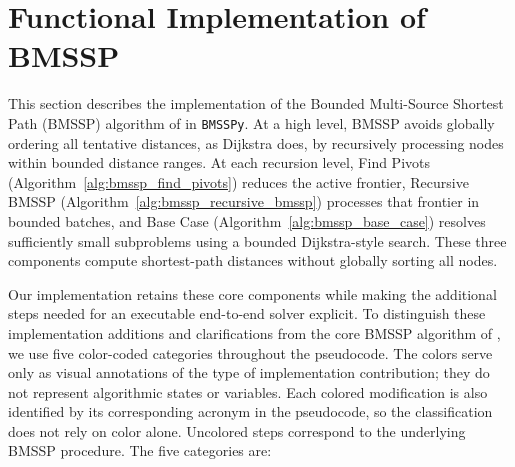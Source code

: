 \documentclass[ijoc,blindrev]{informs3} %
\begin{document}
{\color{blue}
\section{Functional Implementation of BMSSP}\label{sec:func}

This section describes the implementation of the Bounded Multi-Source Shortest Path (BMSSP) algorithm of \citet{duan_breaking_2025} in \texttt{BMSSPy}. At a high level, BMSSP avoids globally ordering all tentative distances, as Dijkstra does, by recursively processing nodes within bounded distance ranges. At each recursion level, Find Pivots (Algorithm~\ref{alg:bmssp_find_pivots}) reduces the active frontier, Recursive BMSSP (Algorithm~\ref{alg:bmssp_recursive_bmssp}) processes that frontier in bounded batches, and Base Case (Algorithm~\ref{alg:bmssp_base_case}) resolves sufficiently small subproblems using a bounded Dijkstra-style search. These three components compute shortest-path distances without globally sorting all nodes.

Our implementation retains these core components while making the additional steps needed for an executable end-to-end solver explicit. To distinguish these implementation additions and clarifications from the core BMSSP algorithm of \citet{duan_breaking_2025}, we use five color-coded categories throughout the pseudocode. The colors serve only as visual annotations of the type of implementation contribution; they do not represent algorithmic states or variables. Each colored modification is also identified by its corresponding acronym in the pseudocode, so the classification does not rely on color alone. Uncolored steps correspond to the underlying BMSSP procedure. The five categories are:

 }
\end{document}
